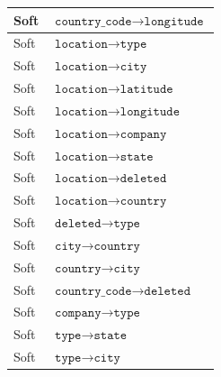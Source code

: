 \documentclass{article}
\begin{document}
\begin{table}[ht]
\begin{tabular}{|p{}|p{}|}
                Soft & $\texttt{country\_code} \rightarrow \texttt{longitude}$ \\ 
                \hline
                Soft & $\texttt{location} \rightarrow \texttt{type}$ \\ 
                \hline
                Soft & $\texttt{location} \rightarrow \texttt{city}$ \\ 
                \hline
                Soft & $\texttt{location} \rightarrow \texttt{latitude}$ \\ 
                \hline
                Soft & $\texttt{location} \rightarrow \texttt{longitude}$ \\ 
                \hline
                Soft & $\texttt{location} \rightarrow \texttt{company}$ \\ 
                \hline
                Soft & $\texttt{location} \rightarrow \texttt{state}$ \\
                \hline
                Soft & $\texttt{location} \rightarrow \texttt{deleted}$ \\ 
                \hline
                Soft & $\texttt{location} \rightarrow \texttt{country}$ \\ 
                \hline
                Soft & $\texttt{deleted} \rightarrow \texttt{type}$ \\ 
                \hline
                Soft & $\texttt{city} \rightarrow \texttt{country}$ \\ 
                \hline
                Soft & $\texttt{country} \rightarrow \texttt{city}$ \\ 
                \hline
                Soft & $\texttt{country\_code} \rightarrow \texttt{deleted}$ \\ 
                \hline
                Soft & $\texttt{company} \rightarrow \texttt{type}$ \\ 
                \hline
                Soft & $\texttt{type} \rightarrow \texttt{state}$ \\ 
                \hline
                Soft & $\texttt{type} \rightarrow \texttt{city}$ \\ 
                \hline
                

\end{tabular}
\end{table}
\end{document}
